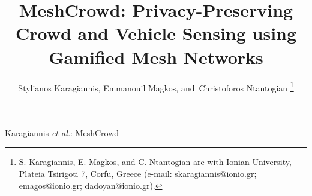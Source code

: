 \documentclass[journal,10pt]{IEEEtran}
\begin{document}
\title{MeshCrowd: Privacy-Preserving Crowd and Vehicle Sensing using Gamified Mesh Networks}

\author{Stylianos Karagiannis,
        Emmanouil Magkos,
        and~Christoforos Ntantogian%
\thanks{S. Karagiannis, E. Magkos, and C. Ntantogian are with Ionian
University, Plateia Tsirigoti 7, Corfu, Greece (e-mail:
skaragiannis@ionio.gr; emagos@ionio.gr; dadoyan@ionio.gr).}}

%
{Karagiannis \MakeLowercase{\textit{et al.}}: MeshCrowd}

\maketitle
\end{document}
